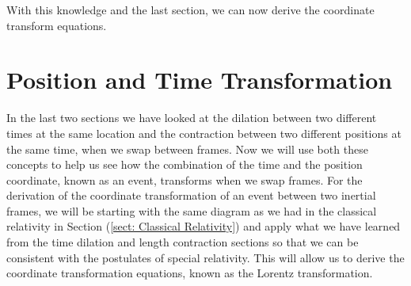 With this knowledge and the last section, we can now derive the coordinate transform equations.

\section{Position and Time Transformation} \label{sect: Position and Time Transformation}

In the last two sections we have looked at the dilation between two different times at the same location and the contraction between two different positions at the same time, when we swap between frames.
Now we will use both these concepts to help us see how the combination of the time and the position coordinate, known as an event, transforms when we swap frames.
For the derivation of the coordinate transformation of an event between two inertial frames, we will be starting with the same diagram as we had in the classical relativity in Section (\ref{sect: Classical Relativity}) and apply what we have learned from the time dilation and length contraction sections so that we can be consistent with the postulates of special relativity.
This will allow us to derive the coordinate transformation equations, known as the Lorentz transformation.

